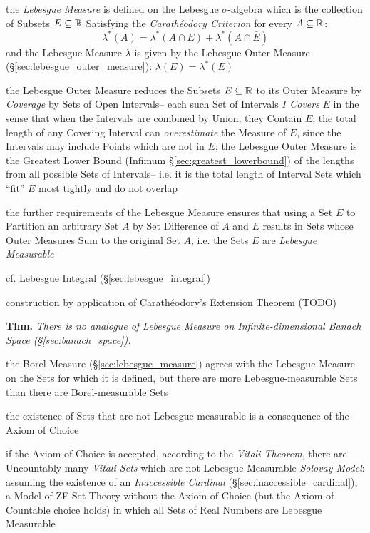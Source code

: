 the \emph{Lebesgue Measure} is defined on the Lebesgue $\sigma$-algebra which is
the collection of Subsets $E \subseteq \mathbb{R}$ Satisfying the
\emph{Carath\'eodory Criterion} for every $A \subseteq \mathbb{R}$:
\[
  \lambda^*(A) = \lambda^*(A \cap E) + \lambda^*(A \cap \bar{E})
\]
and the Lebesgue Measure $\lambda$ is given by the Lebesgue Outer Measure
(\S\ref{sec:lebesgue_outer_measure}): $\lambda(E) = \lambda^*(E)$

the Lebesgue Outer Measure reduces the Subsets $E \subseteq \mathbb{R}$ to its Outer
Measure by \emph{Coverage} by Sets of Open Intervals-- each such Set of
Intervals $I$ \emph{Covers} $E$ in the sense that when the Intervals are
combined by Union, they Contain $E$; the total length of any Covering Interval
can \emph{overestimate} the Measure of $E$, since the Intervals may include
Points which are not in $E$; the Lebesgue Outer Measure is the Greatest Lower
Bound (Infimum \S\ref{sec:greatest_lowerbound}) of the lengths from all possible
Sets of Intervals-- i.e. it is the total length of Interval Sets which ``fit''
$E$ most tightly and do not overlap

the further requirements of the Lebesgue Measure ensures that using a Set $E$ to
Partition an arbitrary Set $A$ by Set Difference of $A$ and $E$ results in Sets
whose Outer Measures Sum to the original Set $A$, i.e. the Sets $E$ are
\emph{Lebesgue Measurable}

\fist cf. Lebesgue Integral (\S\ref{sec:lebesgue_integral})

construction by application of Carath\'eodory's Extension Theorem (TODO)

\textbf{Thm.} \emph{
  There is no analogue of Lebesgue Measure on Infinite-dimensional Banach Space
  (\S\ref{sec:banach_space}).
}

the Borel Measure (\S\ref{sec:lebesgue_measure}) agrees with the Lebesgue
Measure on the Sets for which it is defined, but there are more
Lebesgue-measurable Sets than there are Borel-measurable Sets

the existence of Sets that are not Lebesgue-measurable is a consequence of the
Axiom of Choice

if the Axiom of Choice is accepted, according to the \emph{Vitali Theorem},
there are Uncountably many \emph{Vitali Sets} which are not Lebesgue Measurable
\emph{Solovay Model}: assuming the existence of an \emph{Inaccessible Cardinal}
(\S\ref{sec:inaccessible_cardinal}), a Model of ZF Set Theory without the Axiom
of Choice (but the Axiom of Countable choice holds) in which all Sets of Real
Numbers are Lebesgue Measurable


